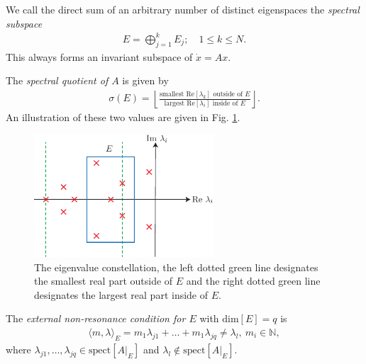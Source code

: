 \begin{definition}
We call the direct sum of an arbitrary number of distinct eigenspaces the \emph{spectral subspace} 
\begin{align}
E = \bigoplus_{j=1}^{k}E_{j};\quad 1 \leq k \leq N.	
\end{align}
This always forms an invariant subspace of $\dot{x}=Ax$.
\end{definition}
\begin{definition}

The \emph{spectral quotient of $A$} is given by
\begin{align}
	\sigma(E) = \left\lfloor \frac{ \textrm{smallest Re} [\lambda _k] \textrm{ outside of }E}{ \textrm{largest Re} [\lambda _i]  \textrm{ inside of } E}\right\rfloor.
\end{align}
An illustration of these two values are given in Fig. \ref{fig:spect_quotient}.
\begin{figure}[h!]
	\centering
	\includegraphics[width=0.6\textwidth]{figures/ch9/26spect_quot.pdf}
	\caption{The eigenvalue constellation, the left dotted green line designates the smallest real part outside of $E$ and the right dotted green line designates the largest real part inside of $E$.}
	\label{fig:spect_quotient}
\end{figure}
\end{definition}

\begin{definition}
The \emph{external non-resonance condition for $E$} with $ \textrm{dim} [E]=q$ is
\begin{align}
	\langle m, \lambda \rangle_{E} = m_1 \lambda _{j1} + \ldots + m_1 \lambda _{jq} \neq \lambda_l,\ m_i \in \mathbb{N}	,
\end{align} 
where $\lambda _{j1},\ldots,\lambda _{jq}\in  \textrm{spect}[A|_{E}] $ and $\lambda _{l} \not \in  \textrm{spect} [A|_{E}]$.
\end{definition}

